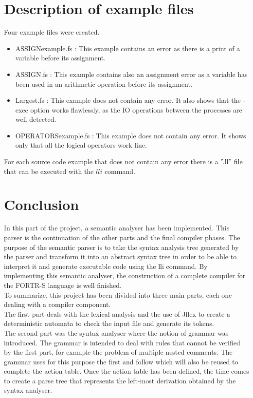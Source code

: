 \documentclass{article}
\begin{document}
\section{Description of example files}
Four example files were created.

\begin{itemize}
    \item ASSIGNexample.fs : This example contains an error as there is a print of a variable before its assignment.
    \item ASSIGN.fs : This example contains also an assignment error as a variable has been used in an arithmetic operation before its assignment.
    \item Largest.fs : This example does not contain any error. It also shows that the -exec option works flawlessly, as the IO operations between the processes are well detected.
    \item OPERATORSexample.fs : This example does not contain any error. It shows only that all the logical operators work fine.
\end{itemize}

For each source code example that does not contain any error there is a ”.ll” file that can be executed with the $lli$ command.

\section{Conclusion}
In this part of the project, a semantic analyser has been implemented. This parser is the continuation of the other parts and the final compiler phases. The purpose of the semantic parser is to take the syntax analysis tree generated by the parser and transform it into an abstract syntax tree in order to be able to interpret it and generate executable code using the lli command.
By implementing this semantic analyser, the construction of a complete compiler for the FORTR-S language is well finished. \\

To summarize, this project has been divided into three main parts, each one dealing with a compiler component. \\

The first part deals with the lexical analysis and the use of Jflex to create a deterministic automata to check the input file and generate its tokens. \\

The second part was the syntax analyser where the notion of grammar was introduced. The grammar is intended to deal with rules that cannot be verified by the first part, for example the problem of multiple nested comments. The grammar uses for this purpose the first and follow which will also be reused to complete the action table. Once the action table has been defined, the time comes to create a parse tree that represents the left-most derivation obtained by the syntax analyser.
\end{document}
